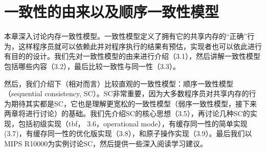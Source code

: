 \documentclass[UTF-8]{ctexrep}
\begin{document}
\chapter{一致性的由来以及顺序一致性模型}
本章深入讨论内存一致性模型。一致性模型定义了拥有它的共享内存的“正确”行为，这样程序员就可以依赖此并对程序执行的结果有预估，实现者也可以依此进行有目的的设计。我们先对一致性模型的由来进行介绍（3.1），然后讲解一致性模型包括哪些内容（3.2），最后比较一致性与同一性（3.3）。
\par 然后，我们介绍下（相对而言）比较直观的一致性模型：顺序一致性模型（sequential consistency, SC）。SC非常重要，因为大多数程序员对共享内存的行为期待其实都是SC，它也是理解更宽松的一致性模型（弱序一致性模型，接下来两章将进行讨论）的基础。我们先介绍SC的核心思想（3.5），再讨论几种SC的实现，包括初级实现（tbf， 3.6，operational mode），有缓存同一性的简单实现(3.7)，有缓存同一性的优化版实现（3.8），和原子操作实现（3.9）。最后我们以MIPS R10000为实例讨论SC，然后提供一些深入阅读学习建议。
\end{document}
